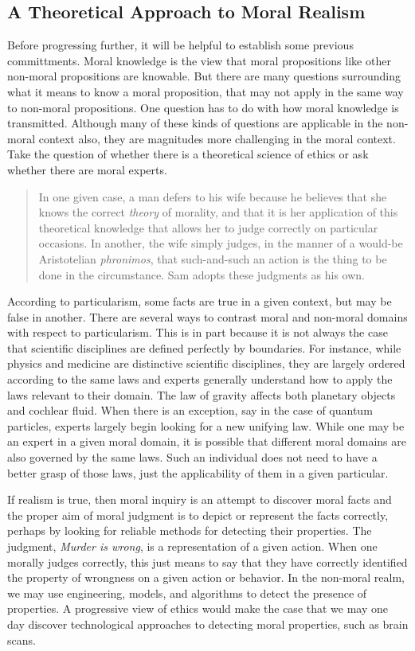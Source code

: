 \documentclass[phdthesis,12pt,final]{wuthesis}
\theoremstyle{definition}
\theoremstyle{definition}
\theoremstyle{definition}
\theoremstyle{definition}
\theoremstyle{remark}
\begin{document}
\subsection{A Theoretical Approach to Moral Realism}\label{a-theoretical-approach-to-moral-realism}

Before progressing further, it will be helpful to establish some previous committments. Moral knowledge is the view that moral propositions like other non-moral propositions are knowable. But there are many questions surrounding what it means to know a moral proposition, that may not apply in the same way to non-moral propositions. One question has to do with how moral knowledge is transmitted. Although many of these kinds of questions are applicable in the non-moral context also, they are magnitudes more challenging in the moral context. Take the question of whether there is a theoretical science of ethics or ask whether there are moral experts.

\begin{quote}
In one given case, a man defers to his wife because he believes that she knows the correct \emph{theory} of morality, and that it is her application of this theoretical knowledge that allows her to judge correctly on particular occasions. In another, the wife simply judges, in the manner of a would-be Aristotelian \emph{phronimos}, that such-and-such an action is the thing to be done in the circumstance. Sam adopts these judgments as his own.
\end{quote}

According to particularism, some facts are true in a given context, but may be false in another. There are several ways to contrast moral and non-moral domains with respect to particularism. This is in part because it is not always the case that scientific disciplines are defined perfectly by boundaries. For instance, while physics and medicine are distinctive scientific disciplines, they are largely ordered according to the same laws and experts generally understand how to apply the laws relevant to their domain. The law of gravity affects both planetary objects and cochlear fluid. When there is an exception, say in the case of quantum particles, experts largely begin looking for a new unifying law. While one may be an expert in a given moral domain, it is possible that different moral domains are also governed by the same laws. Such an individual does not need to have a better grasp of those laws, just the applicability of them in a given particular.

If realism is true, then moral inquiry is an attempt to discover moral facts and the proper aim of moral judgment is to depict or represent the facts correctly, perhaps by looking for reliable methods for detecting their properties. The judgment, \emph{Murder is wrong}, is a representation of a given action. When one morally judges correctly, this just means to say that they have correctly identified the property of wrongness on a given action or behavior. In the non-moral realm, we may use engineering, models, and algorithms to detect the presence of properties. A progressive view of ethics would make the case that we may one day discover technological approaches to detecting moral properties, such as brain scans.
\end{document}
